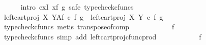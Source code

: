 \begin{isabellebody}
\ \ \ \ \isamarkupfalse%
\ {\isacharparenleft}{\kern0pt}intro\ exI{\isacharbrackleft}{\kern0pt}\ x{\isacharequal}{\kern0pt}{\isachardoublequoteopen}{\isasymlangle}f\isactrlsup {\isasymflat}\ {\isacharcomma}{\kern0pt}g\isactrlsup {\isasymflat}{\isasymrangle}\isactrlsup {\isasymsharp}{\isachardoublequoteclose}{\isacharbrackright}{\kern0pt}{\isacharcomma}{\kern0pt}\ safe{\isacharcomma}{\kern0pt}\ typecheck{\isacharunderscore}{\kern0pt}cfuncs{\isacharparenright}{\kern0pt}\isanewline
\ \ \ \ \ \ \isamarkupfalse%
\ {\isachardoublequoteopen}{\isacharparenleft}{\kern0pt}{\isacharparenleft}{\kern0pt}left{\isacharunderscore}{\kern0pt}cart{\isacharunderscore}{\kern0pt}proj\ X\ Y{\isacharparenright}{\kern0pt}\isactrlbsup A\isactrlesup \isactrlsub f{\isacharparenright}{\kern0pt}\ {\isasymcirc}\isactrlsub c\ {\isasymlangle}f\isactrlsup {\isasymflat}\ {\isacharcomma}{\kern0pt}g\isactrlsup {\isasymflat}{\isasymrangle}\isactrlsup {\isasymsharp}\ {\isacharequal}{\kern0pt}\ {\isacharparenleft}{\kern0pt}{\isacharparenleft}{\kern0pt}left{\isacharunderscore}{\kern0pt}cart{\isacharunderscore}{\kern0pt}proj\ X\ Y{\isacharparenright}{\kern0pt}\ {\isasymcirc}\isactrlsub c\ {\isasymlangle}f\isactrlsup {\isasymflat}\ {\isacharcomma}{\kern0pt}g\isactrlsup {\isasymflat}{\isasymrangle}{\isacharparenright}{\kern0pt}\isactrlsup {\isasymsharp}{\isachardoublequoteclose}\isanewline
\ \ \ \ \ \ \ \ \isamarkupfalse%
\ {\isacharparenleft}{\kern0pt}typecheck{\isacharunderscore}{\kern0pt}cfuncs{\isacharcomma}{\kern0pt}\ metis\ transpose{\isacharunderscore}{\kern0pt}of{\isacharunderscore}{\kern0pt}comp{\isacharparenright}{\kern0pt}\isanewline
\ \ \ \ \ \ \isamarkupfalse%
\ \isamarkupfalse%
\ {\isachardoublequoteopen}{\isachardot}{\kern0pt}{\isachardot}{\kern0pt}{\isachardot}{\kern0pt}\ {\isacharequal}{\kern0pt}\ f\isactrlsup {\isasymflat}\isactrlsup {\isasymsharp}{\isachardoublequoteclose}\isanewline
\ \ \ \ \ \ \ \ \isamarkupfalse%
\ {\isacharparenleft}{\kern0pt}typecheck{\isacharunderscore}{\kern0pt}cfuncs{\isacharcomma}{\kern0pt}\ simp\ add{\isacharcolon}{\kern0pt}\ left{\isacharunderscore}{\kern0pt}cart{\isacharunderscore}{\kern0pt}proj{\isacharunderscore}{\kern0pt}cfunc{\isacharunderscore}{\kern0pt}prod{\isacharparenright}{\kern0pt}\isanewline
\ \ \ \ \ \ \isamarkupfalse%
\ \isamarkupfalse%
\ {\isachardoublequoteopen}{\isachardot}{\kern0pt}{\isachardot}{\kern0pt}{\isachardot}{\kern0pt}\ {\isacharequal}{\kern0pt}\ f{\isachardoublequoteclose}\isanewline

\end{isabellebody}
